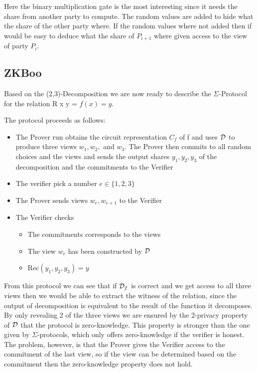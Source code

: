 Here the binary multiplication gate is the most interesting since it needs the
share from another party to compute. The random values are added to hide what
the share of the other party where. If the random values where not added then if
would be easy to deduce what the share of $P_{i+1}$ where given access to the
view of party $P_{i}$.


\subsection{ZKBoo}
\label{subsec:general:zkboo}
Based on the (2,3)-Decomposition we are now ready to describe the
$\Sigma$-Protocol for the relation R x y = $f(x) = y$.

The protocol proceeds as follows:
\begin{itemize}
  \item The Prover run obtains the circuit representation $C_{f}$ of f and uses
    $\mathcal{D}$ to produce three views $w_{1}, w_{2},$ and $w_{3}$.
    The Prover then commits to all random choices and the views and sends the
    output shares $y_{1}, y_{2}, y_{3}$ of the decomposition and the commitments to the Verifier
  \item The verifier pick a number $e \in \{1,2,3\}$
  \item The Prover sends views $w_{e}, w_{e+1}$ to the Verifier
  \item The Verifier checks
    \begin{itemize}
      \item The commitments corresponds to the views
      \item The view $w_{e}$ has been constructed by $\mathcal{D}$
      \item Rec$(y_{1}, y_{2}, y_{3}) = y$
    \end{itemize}
\end{itemize}

From this protocol we can see that if $\mathcal{D}_{f}$ is correct and we get access to
all three views then we would be able to extract the witness of the relation,
since the output of decomposition is equivalent to the result of the function it decomposes.
By only revealing 2 of the three views we are ensured by the 2-privacy property
of $\mathcal{D}$ that the protocol is zero-knowledge. This
property is stronger than the one given by $\Sigma$-protocols, which only offers
zero-knowledge if the verifier is honest. The problem, however, is that the
Prover gives the Verifier access to the commitment of the last view, so if the
view can be determined based on the commitment then the zero-knowledge property
does not hold.


